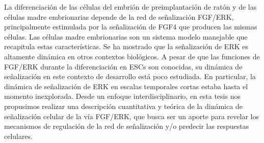 \documentclass[./main.tex]{subfiles}
\begin{document}





La diferenciación de las células del embrión de preimplantación de ratón y de las células madre embrionarias depende de la red de señalización FGF/ERK, principalmente estimulada por la señalización de FGF4 que producen las mismas células. Las células madre embrionarias son un sistema modelo manejable que recapitula estas características. Se ha mostrado que la señalización de ERK es altamente dinámica en otros contextos biológicos. A pesar de que las funciones de FGF/ERK durante la diferenciación en ESCs son conocidas, su dinámica de señalización en este contexto de desarrollo está poco estudiada. En particular, la dinámica de señalización de ERK en escalas temporales cortas estaba hasta el momento inexplorada. Desde un enfoque interdisciplinario, en esta tesis nos propusimos realizar una descripción cuantitativa y teórica de la dinámica de señalización celular de la vía FGF/ERK, que busca ser un aporte para revelar los mecanismos de regulación de la red de señalización y/o predecir las respuestas celulares. 


\end{document}
